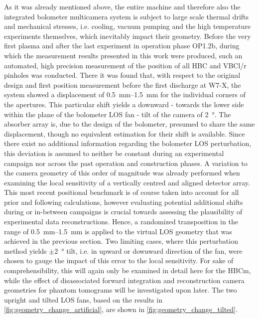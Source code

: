 %
            As it was already mentioned above, the entire machine and therefore also the integrated bolometer multicamera system is subject to large scale thermal drifts and mechanical stresses, i.e. cooling, vacuum pumping and the high temperature experiments themselves, which inevitably impact their geometry. Before the very first plasma and after the last experiment in operation phase OP1.2b, during which the measurement results presented in this work were produced, such an automated, high precision measurement of the position of all HBC and VBCl/r pinholes was conducted. There it was found that, with respect to the original design and first position measurement before the first discharge at W7-X, the system showed a displacement of \SIrange{0.5}{1.5}{\milli\meter} for the individual corners of the apertures. This particular shift yields a downward - towards the lower side within the plane of the bolometer LOS fan - tilt of the camera of \SI{2}{\degree}. The absorber array is, due to the design of the bolometer, presumed to share the same displacement, though no equivalent estimation for their shift is available. Since there exist no additional information regarding the bolometer LOS perturbation, this deviation is assumed to neither be constant during an experimental campaign nor across the past operation and construction phases. A variation to the camera geometry of this order of magnitude was already performed when examining the local sensitivity of a vertically centred and aligned detector array. This most recent positional benchmark is of course taken into account for all prior and following calculations, however evaluating potential additional shifts during or in-between campaigns is crucial towards assessing the plausibility of experimental data reconstructions. Hence, a randomized transposition in the range of \SIrange{0.5}{1.5}{\milli\meter} is applied to the virtual LOS geometry that was achieved in the previous section. Two limiting cases, where this perturbation method yields $\pm$\SI{2}{\degree} tilt, i.e. in upward or downward direction of the fan, were chosen to gauge the impact of this error to the local sensitivity. For sake of comprehensibility, this will again only be examined in detail here for the HBCm, while the effect of disassociated forward integration and reconstruction camera geometries for phantom tomograms will be investigated upon later. The two upright and tilted LOS fans, based on the results in \cref{fig:geometry_change_artificial}, are shown in \cref{fig:geometry_change_tilted}.\\%
